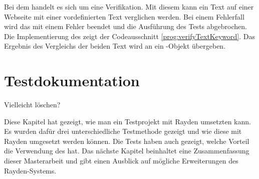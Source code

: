 \SuperPar
Bei dem   handelt es sich um eine Verifikation. Mit diesem  kann ein Text auf einer Webseite mit einer vordefinierten Text verglichen werden. Bei einem Fehlerfall wird das  mit einem Fehler beendet und die Ausführung des Tests abgebrochen. Die Implementierung des  zeigt der Codeausschnitt \ref{prog:verifyTextKeyword}. Das Ergebnis des Vergleichs der beiden Text wird an ein -Objekt übergeben. 


\section{Testdokumentation}

\todo
Vielleicht löschen?

\SuperPar
Diese Kapitel hat gezeigt, wie man ein Testprojekt mit Rayden umsetzten kann. Es wurden dafür drei unterschiedliche Testmethode gezeigt und wie diese mit Rayden umgesetzt werden können. Die Tests haben auch gezeigt, welche Vorteil die Verwendung des  hat. Das nächste Kapitel beinhaltet eine Zusammenfassung dieser Masterarbeit und gibt einen Ausblick auf mögliche Erweiterungen des Rayden-Systems. 